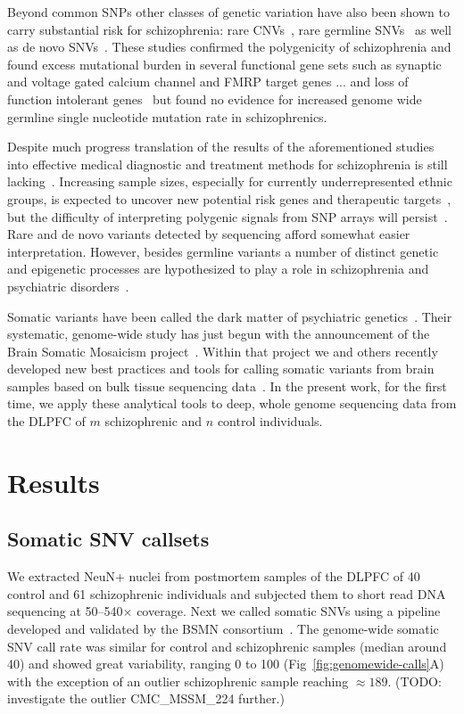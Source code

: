 \documentclass[letterpaper]{article}
\begin{document}
Beyond common SNPs other classes of genetic variation have also been shown to
carry substantial risk for schizophrenia: rare CNVs~\citep{Rees2014}, rare germline
SNVs~\citep{Purcell2014,Singh2017} as well as de novo
SNVs~\citep{Fromer2014,Rees2020}.  These studies confirmed the polygenicity of
schizophrenia and found excess mutational burden in several functional
gene sets such as synaptic and voltage gated calcium channel and FMRP target
genes\citep{Fromer2014,Purcell2014} ... and loss of function intolerant
genes~\citep{Rees2020,Singh2017} but found no evidence for increased genome
wide germline single nucleotide mutation rate in schizophrenics.

Despite much progress translation of the results of the aforementioned studies
into effective medical diagnostic and treatment methods for schizophrenia is
still lacking~\citep{Breen2016,Foley2017}. Increasing sample sizes, especially
for currently underrepresented ethnic groups, is expected to uncover new
potential risk genes and therapeutic targets~\citep{Visscher2017}, but the difficulty of interpreting
polygenic signals from SNP arrays will persist~\citep{Boyle2017}.  Rare and de
novo variants detected by sequencing afford somewhat easier interpretation.
However, besides germline variants a number of distinct genetic and epigenetic
processes are hypothesized to play a role in schizophrenia and psychiatric
disorders~\citep{PsychENCODEConsortium2015}.

Somatic variants have been called the dark matter of psychiatric
genetics~\citep{Insel2014}.  Their systematic, genome-wide study has just begun
with the announcement of the Brain Somatic Mosaicism
project~\citep{McConnell2017}.  Within that project we and others recently
developed new best practices and tools for calling somatic variants from brain
samples based on bulk tissue sequencing data~\citep{Wang2021}.  In the present
work, for the first time, we apply these analytical tools to deep, whole
genome sequencing data from the DLPFC of \(m\) schizophrenic and \(n\) control
individuals.

\section*{Results}

\subsection*{Somatic SNV callsets}

We extracted NeuN+ nuclei from postmortem samples of the DLPFC of 40 control
and 61 schizophrenic individuals and subjected them to short read DNA
sequencing at 50--540\(\times\) coverage.  Next we called somatic SNVs using a
pipeline developed and validated by the BSMN consortium~\citep{Wang2021}.  The
genome-wide somatic SNV call rate was similar for control and schizophrenic
samples (median around 40) and showed great variability, ranging 0 to 100
(Fig~\ref{fig:genomewide-calls}A) with the exception of an outlier
schizophrenic sample reaching \(\approx 189\).  (TODO: investigate the outlier
CMC_MSSM_224 further.)
\end{document}
